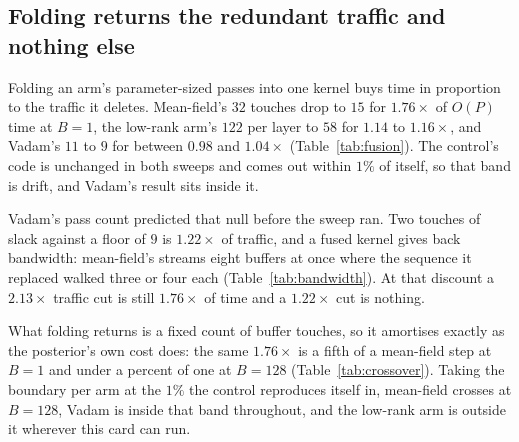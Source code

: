 \begin{table}[t]
  \centering
  \resizebox{\linewidth}{!}{}
  \caption{The batch sweep for the shipped code. $O(P)\%$ is all parameter-sized work
  over the step, Bayesian or not; the ensemble column is one member.}
  \label{tab:amortization}
\end{table}

\subsection{Folding returns the redundant traffic and nothing else}
\label{sec:find:fusion}

Folding an arm's parameter-sized passes into one kernel buys time in proportion to the
traffic it deletes. Mean-field's $32$ touches drop to $15$ for $1.76\times$ of $O(P)$
time at $B = 1$, the low-rank arm's $122$ per layer to $58$ for $1.14$ to
$1.16\times$, and Vadam's $11$ to $9$ for between $0.98$ and $1.04\times$
(Table~\ref{tab:fusion}). The control's code is unchanged in both sweeps and comes out
within $1\%$ of itself, so that band is drift, and Vadam's result sits inside it.

Vadam's pass count predicted that null before the sweep ran. Two touches of slack
against a floor of $9$ is $1.22\times$ of traffic, and a fused kernel gives back
bandwidth: mean-field's streams eight buffers at once where the sequence it replaced
walked three or four each (Table~\ref{tab:bandwidth}). At that discount a $2.13\times$
traffic cut is still $1.76\times$ of time and a $1.22\times$ cut is nothing.

What folding returns is a fixed count of buffer touches, so it amortises exactly as
the posterior's own cost does: the same $1.76\times$ is a fifth of a mean-field step
at $B = 1$ and under a percent of one at $B = 128$ (Table~\ref{tab:crossover}). Taking
the boundary per arm at the $1\%$ the control reproduces itself in, mean-field crosses
at $B = 128$, Vadam is inside that band throughout, and the low-rank arm is outside it
wherever this card can run.

\begin{table}[t]
  \centering
  \resizebox{\linewidth}{!}{}
  \caption{Parameter-sized work before and after folding, where both sweeps measured
  the point. The ensemble's code is identical in both, so its rows are the drift.}
  \label{tab:fusion}
\end{table}

\begin{table}[t]
  \centering
  \resizebox{\linewidth}{!}{}
  \caption{Where folding stops being separable from drift. What it returns is $O(P)$
  time deleted, over the unfused step; $B^\ast$ is the first batch size measured at
  which that lands inside the control's band, or a bound where the sweep never
  brackets it.}
  \label{tab:crossover}
\end{table}

